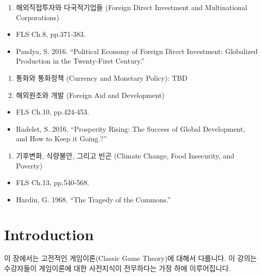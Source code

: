 \documentclass[]{book}
\providecommand{\tightlist}{%
  \setlength{\itemsep}{0pt}\setlength{\parskip}{0pt}}
\begin{document}
\begin{enumerate}
\def\labelenumi{\arabic{enumi}.}
\setcounter{enumi}{18}
\tightlist
\item
  해외직접투자와 다국적기업들 (Foreign Direct Investment and Multinational Corporations)
\end{enumerate}

\begin{itemize}
\tightlist
\item
  FLS Ch.8, pp.371-383.
\item
  Pandya, S. 2016. ``Political Economy of Foreign Direct Investment: Globalized Production in the Twenty-First Century.''
\end{itemize}

\begin{enumerate}
\def\labelenumi{\arabic{enumi}.}
\setcounter{enumi}{19}
\item
  통화와 통화정책 (Currency and Monetary Policy): TBD
\item
  해외원조와 개발 (Foreign Aid and Development)
\end{enumerate}

\begin{itemize}
\tightlist
\item
  FLS Ch.10, pp.424-453.
\item
  Radelet, S. 2016. ``Prosperity Rising: The Success of Global Development, and How to Keep it Going.?''
\end{itemize}

\begin{enumerate}
\def\labelenumi{\arabic{enumi}.}
\setcounter{enumi}{21}
\tightlist
\item
  기후변화, 식량불안, 그리고 빈곤 (Climate Change, Food Insecurity, and Poverty)
\end{enumerate}

\begin{itemize}
\tightlist
\item
  FLS Ch.13, pp.540-568.
\item
  Hardin, G. 1968. ``The Tragedy of the Commons.''
\end{itemize}

\hypertarget{intro}{%
\chapter{Introduction}\label{intro}}

이 장에서는 고전적인 게임이론(Classic Game Theory)에 대해서 다룹니다. 이 강의는 수강자들이 게임이론에 대한 사전지식이 전무하다는 가정 하에 이루어집니다.
\end{document}
